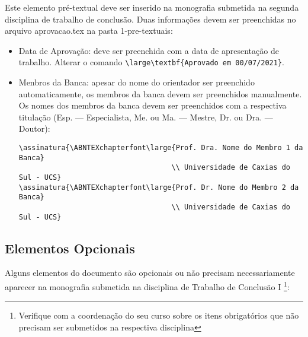 Este elemento pré-textual deve ser inserido na monografia submetida na segunda disciplina de trabalho de conclusão. Duas informações devem ser preenchidas no arquivo aprovacao.tex na pasta 1-pre-textuais:

\begin{itemize}
    \item Data de Aprovação: deve ser preenchida com a data de apresentação de trabalho. Alterar o comando \verb!\large\textbf{Aprovado em 00/07/2021}!.
    \item Menbros da Banca: apesar do nome do orientador ser preenchido automaticamente, os membros da banca devem ser preenchidos manualmente. Os nomes dos membros da banca devem ser preenchidos com a respectiva titulação (Esp. --- Especialista, Me. ou Ma. --- Mestre, Dr. ou Dra. --- Doutor):
    \begingroup
    \fontsize{10pt}{12pt}\selectfont
    \begin{verbatim}
\assinatura{\ABNTEXchapterfont\large{Prof. Dra. Nome do Membro 1 da Banca} 
                                    \\ Universidade de Caxias do Sul - UCS}
\assinatura{\ABNTEXchapterfont\large{Prof. Dr. Nome do Membro 2 da Banca} 
                                    \\ Universidade de Caxias do Sul - UCS}
    \end{verbatim}
    \endgroup
\end{itemize}

\subsection{Elementos Opcionais} 

Alguns elementos do documento são opcionais ou não precisam necessariamente aparecer na monografia submetida na disciplina de Trabalho de Conclusão I \footnote{Verifique com a coordenação do seu curso sobre os itens obrigatórios que não precisam ser submetidos na respectiva disciplina}:


